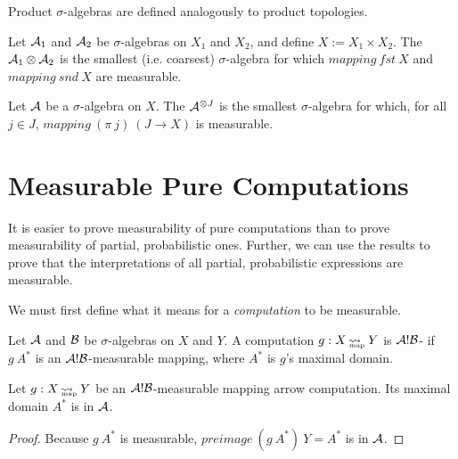 Product $\sigma$-algebras are defined analogously to product topologies.

\begin{definition}
\label{def:finite-product-sigma-algebra}
Let $\mathcal{A}_1$ and $\mathcal{A}_2$ be $\sigma$-algebras on $X_1$ and $X_2$, and define $X := X_1 \times X_2$.
The  $\mathcal{A}_1 \otimes \mathcal{A}_2$ is the smallest (i.e. coarsest) $\sigma$-algebra for which $mapping~fst~X$ and $mapping~snd~X$ are measurable.%
\end{definition}

\begin{definition}
\label{def:arbitrary-product-sigma-algebra}
Let $\mathcal{A}$ be a $\sigma$-algebra on $X$.
The  $\mathcal{A}^{\otimes J}$ is the smallest $\sigma$-algebra for which, for all $j \in J$, $mapping~(\pi~j)~(J \to X)$ is measurable.%
\end{definition}

\section{Measurable Pure Computations}

It is easier to prove measurability of pure computations than to prove measurability of partial, probabilistic ones.
Further, we can use the results to prove that the interpretations of all partial, probabilistic expressions are measurable.

We must first define what it means for a \emph{computation} to be measurable.

\begin{definition}
\label{def:measurable-mapping-arrow-computation}
Let $\mathcal{A}$ and $\mathcal{B}$ be $\sigma$-algebras on $X$ and $Y$.
A computation $g : X \operatorname{\rightsquigarrow_{\mspace{-21mu}_\mathrm{map}}} Y$ is $\mathcal{A}!\mathcal{B}$- if $g~A^*$ is an $\mathcal{A}!\mathcal{B}$-measurable mapping, where $A^*$ is $g$'s maximal domain.%
\end{definition}

\begin{theorem}
Let $g : X \operatorname{\rightsquigarrow_{\mspace{-21mu}_\mathrm{map}}} Y$ be an $\mathcal{A}!\mathcal{B}$-measurable mapping arrow computation.
Its maximal domain $A^*$ is in $\mathcal{A}$.
\end{theorem}
\begin{proof}
Because $g~A^*$ is measurable, $preimage~(g~A^*)~Y = A^*$ is in $\mathcal{A}$.
\end{proof}

